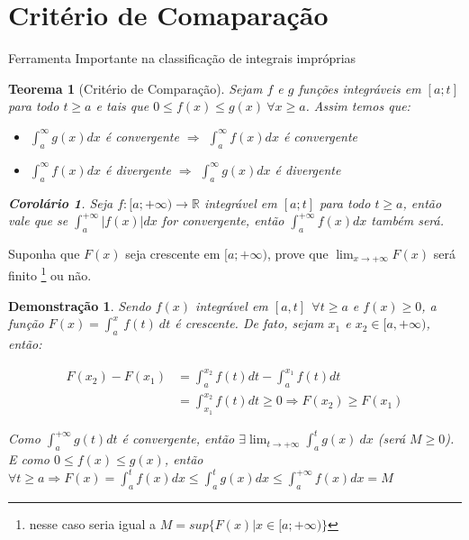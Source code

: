 \documentclass[12pt,openany]{book}
\newtheorem{theorem}{Teorema}[section]
\newtheorem{corollary}{Corolário}[theorem]
\newtheorem{demonstration}{Demonstração}
\begin{document}
\section{Critério de Comaparação}
\label{sec:23}

\hspace{5mm} Ferramenta Importante na classificação de integrais impróprias

\begin{theorem}[Critério de Comparação]
Sejam $f$ e $g$ funções integráveis em $[a;t]$ para todo $t\geq a$ e tais que $0\leq f(x)\leq g(x)\ \forall x \geq a$.  Assim temos que:
\begin{itemize}
\item $\displaystyle{\int_a^{\infty} g(x)dx}$ é convergente $\Rightarrow$ $\displaystyle{\int_a^{\infty} f(x)dx}$ é convergente
\item $\displaystyle{\int_a^{\infty} f(x)dx}$ é divergente $\Rightarrow$ $\displaystyle{\int_a^{\infty} g(x)dx}$ é divergente
\end{itemize}
\vspace{10pt}
\begin{corollary}
Seja $f:[a;+\infty) \rightarrow \mathds{R}$ integrável em $[a;t]$ para todo $t \geq a$, então vale que se $\displaystyle{\int_a^{+\infty}|f(x)| dx}$ for convergente, então $\displaystyle{\int_a^{+\infty} f(x) dx}$ também será.
\end{corollary}
\end{theorem}
\vspace{10pt}

Suponha que $F(x)$ seja crescente em $[a;+\infty)$, prove que $\displaystyle{\lim_{x \rightarrow +\infty} F(x) }$ será finito \footnote{nesse caso seria igual a $M = sup\{F(x)| x \in [a;+\infty)\}$ } ou não.

\begin{demonstration}
Sendo $f(x)$ integrável em $[a,t] \ \ \forall t \geq a$ e $f(x) \geq 0$, a função $\displaystyle{F(x) = \int_a^x\ f(t)\ dt}$ é crescente. De fato, sejam $x_1$ e $x_2 \in [a,+\infty)$, então:

\begin{align*}
F(x_2)-F(x_1) &= \int_a^{x_2} f(t)dt - \int_a^{x_1} f(t)dt \\
&= \int_{x_1}^{x_2} f(t)dt \geq 0 \Rightarrow F(x_2) \geq F(x_1)
\end{align*}

Como $\displaystyle{\int_a^{+\infty} g(t)dt}$ é convergente, então $\displaystyle{\exists \lim_{t \rightarrow +\infty} \int_a^t g(x)\ dx} $ (será $M \geq 0$). E como $0 \leq f(x) \leq g(x)$, então $\forall t \geq a \Rightarrow F(x) = \int_a^t f(x)dx \leq \int_a^t g(x)dx \leq \int_a^{+\infty} f(x)dx = M$
\end{demonstration}
\vspace{10pt}
\end{document}
